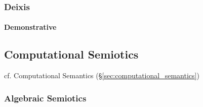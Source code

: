 \subsubsection{Deixis}\label{sec:deixis}

\paragraph{Demonstrative}\label{sec:demonstrative}\hfill



\subsection{Computational Semiotics}\label{sec:computational_semiotics}

cf. Computational Semantics (\S\ref{sec:computational_semantics})



\subsubsection{Algebraic Semiotics}\label{sec:algebraic_semiotics}
